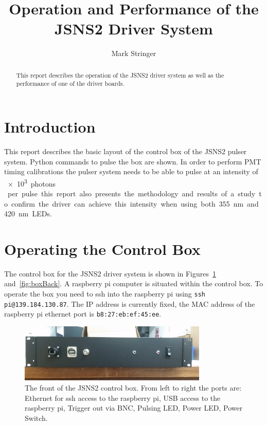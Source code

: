 \documentclass[11pt, a4paper, oneside ]{article}
\author{Mark Stringer}
\title{\bf{Operation and Performance of the JSNS2 Driver System}}
\begin{document}
\maketitle
\begin{abstract}
This report describes the operation of the JSNS2 driver system as well as the performance of one of the driver boards.
\end{abstract}

\section{Introduction}
This report describes the basic layout of the control box of the JSNS2 pulser system. Python commands to pulse the box are shown. In order to perform PMT timing calibrations the pulser system needs to be able to pulse at an intensity of \SI{e3}{photons } per pulse this report also presents the methodology and results of a study to confirm the driver can achieve this intensity when using both \SI{355}{nm} and \SI{420}{nm} LEDs.

\section{Operating the Control Box}

The control box for the JSNS2 driver system is shown in Figures~\ref{fig:boxFront} and~\ref{fig:boxBack}. A raspberry pi computer is situated within the control box. To operate the box you need to ssh into the raspberry pi using \texttt{ssh pi@139.184.130.87}. The IP address is currently fixed, the MAC address of the raspberry pi ethernet port is \texttt{b8:27:eb:ef:45:ee}.

\begin{figure}[H]
    \centering
    \includegraphics[width=0.8\textwidth]{figures/BoxFront.jpg}
    \caption{The front of the JSNS2 control box. From left to right the ports are: Ethernet for ssh access to the raspberry pi, USB access to the raspberry pi, Trigger out via BNC, Pulsing LED, Power LED, Power Switch.}
    \label{fig:boxFront}
\end{figure}
\end{document}
